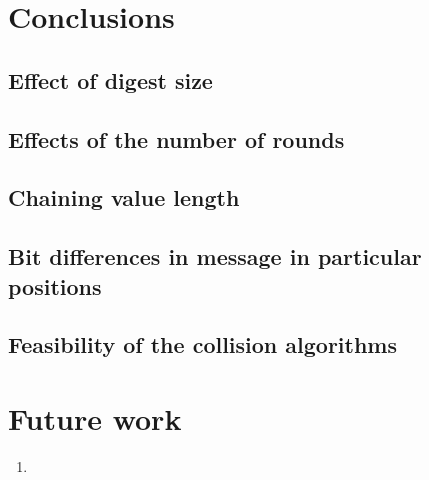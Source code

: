 \section{Conclusions}

\subsection{Effect of digest size}

\subsection{Effects of the number of rounds}

\subsection{Chaining value length}

\subsection{Bit differences in message in particular positions}

\subsection{Feasibility of the collision algorithms}

\section{Future work}

\begin{enumerate}
\item
\end{enumerate}
